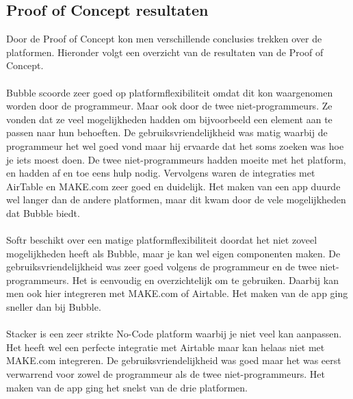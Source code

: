 \subsection{Proof of Concept resultaten}%
\label{subsec:proof-of-concept-resultaten}
Door de Proof of Concept kon men verschillende conclusies trekken over de platformen. Hieronder volgt een overzicht van de resultaten van de Proof of Concept.
\\
\\
Bubble scoorde zeer goed op platformflexibiliteit omdat dit kon waargenomen worden door de programmeur. Maar ook door de twee niet-programmeurs. Ze vonden dat ze veel mogelijkheden hadden om bijvoorbeeld een element aan te passen 
naar hun behoeften. De gebruiksvriendelijkheid was matig waarbij de programmeur het wel goed vond maar hij ervaarde dat het soms zoeken was hoe je iets moest doen. De twee niet-programmeurs hadden moeite met het platform, en hadden af en toe eens hulp nodig. Vervolgens 
waren de integraties met AirTable en MAKE.com zeer goed en duidelijk. Het maken van een app duurde wel langer dan de andere platformen, maar dit kwam door de vele mogelijkheden dat Bubble biedt.
\\
\\
Softr beschikt over een matige platformflexibiliteit doordat het niet zoveel mogelijkheden heeft als Bubble, maar je kan wel eigen componenten maken. De gebruiksvriendelijkheid was zeer goed volgens de programmeur en de twee niet-programmeurs. Het is eenvoudig en overzichtelijk om te gebruiken.
Daarbij kan men ook hier integreren met MAKE.com of Airtable. Het maken van de app ging sneller dan bij Bubble.
\\
\\
Stacker is een zeer strikte No-Code platform waarbij je niet veel kan aanpassen. Het heeft wel een perfecte integratie met Airtable maar kan helaas niet met MAKE.com integreren.
De gebruiksvriendelijkheid was goed maar het was eerst verwarrend voor zowel de programmeur als de twee niet-programmeurs. Het maken van de app ging het snelst van de drie platformen.
